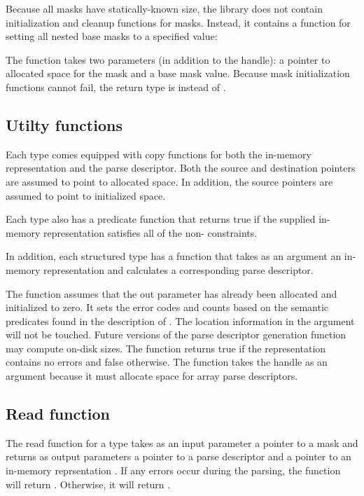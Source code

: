 
Because all masks have statically-known size, the library does not
contain initialization and cleanup functions for masks.  
Instead, it contains a function for setting all nested base masks 
to a specified value:  


The function takes two parameters (in
addition to the \pads{} handle): a pointer to allocated space for the
mask and a base mask value.  Because mask initialization
functions cannot fail, the return type is  instead of
. 

\subsection{Utilty functions}
Each type  comes equipped with copy functions for both the
in-memory representation and the parse descriptor.  Both the source
and destination pointers are assumed to point to allocated space.  In
addition, the source pointers are assumed to point to initialized
space.


\noindent
Each type  also has a predicate function that returns true if
the supplied in-memory representation satisfies all of the
non-\pparsecheck{} constraints.


\noindent
In addition, each structured type  has a function  that
takes as an argument an in-memory representation and calculates a
corresponding parse descriptor.  


\noindent
The function assumes that the out parameter  has already been
allocated and initialized to zero.  It sets the error codes and counts
based on the semantic predicates found in the description of .
The location information in the argument  will not be
touched. Future versions of the parse descriptor generation function
may compute on-disk sizes. The function returns true if the
representation contains no errors and false otherwise. The function
takes the  handle as an argument because it must allocate
space for array parse descriptors. 


 
\subsection{Read function}
\label{sec:common-features-read-function}
The read function for a \pads{} type  takes as an input parameter a
pointer to a mask  and returns as output parameters a pointer to
a parse descriptor  and a pointer to an in-memory
reprsentation .  If any errors occur during the parsing,
the function will return .  Otherwise, it
will return .  

